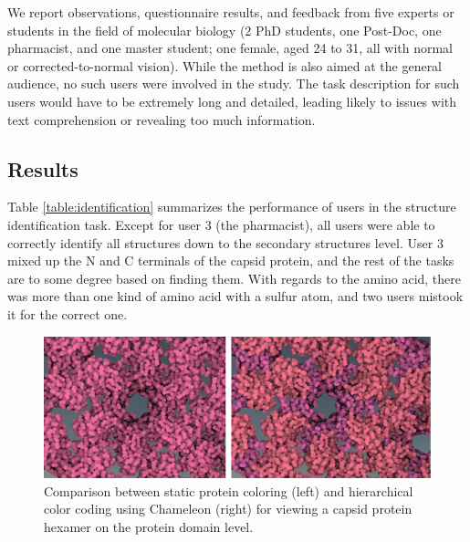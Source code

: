 \documentclass{egpubl}
\begin{document}
	
	We  report observations, questionnaire results, and feedback from five experts or students in the field of molecular biology (2 PhD students, one Post-Doc, one pharmacist, and one master student; one female, aged 24 to 31, all with normal or corrected-to-normal vision). 
	While the method is also aimed at the general audience, no such users were involved in the study. 
	The task description for such users would have to be extremely long and detailed, leading likely to issues with text comprehension or revealing too much information. 
	
	\subsection{Results}
	
	Table \ref{table:identification} summarizes the performance of users in the structure identification task. 
	Except for user 3 (the pharmacist), all users were able to correctly identify all structures down to the secondary structures level. 
	User 3 mixed up the N and C terminals of the capsid protein, and the rest of the tasks are to some degree based on finding them.
	With regards to the amino acid, there was more than one kind of amino acid with a sulfur atom, and two users mistook it for the correct one.
	
	
	
	\begin{figure}
		\centering
		\includegraphics[width=1\linewidth]{Figures/comparison}
		\caption{Comparison between static protein coloring (left) and hierarchical color coding using Chameleon (right) for viewing a capsid protein hexamer on the protein domain level. }
		\label{fig:comparison}
	\end{figure}
	
\end{document}

